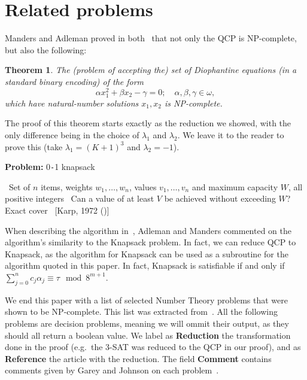 \documentclass{amsart}
\theoremstyle{plain}
\newtheorem{theorem}{Theorem}
\begin{document}
\section{Related problems}

Manders and Adleman proved in both~\cite{qcp1,qcp2} that not only the QCP is NP-complete, but also
the following:

\begin{theorem}\label{diophantine-thm}
  The (problem of accepting the) set of Diophantine equations (in a standard binary encoding) of
  the form
  \begin{equation*}
    \alpha x_1^2+\beta x_2-\gamma=0;\quad\alpha,\beta,\gamma\in\omega,
  \end{equation*}
  which have natural-number solutions $x_1,x_2$ is NP-complete.
\end{theorem}

The proof of this theorem starts exactly as the reduction we showed, with the only difference being
in the choice of $\lambda_1$ and $\lambda_2$. We leave it to the reader to prove this (take
$\lambda_1={(K+1)}^3$ and $\lambda_2=-1$).

\begin{algorithm}[h]
  \caption*{\textbf{Problem:} 0\texttt{-}1 knapsack}
  \begin{algorithmic}[1]
    \Require\, Set of $n$ items, weights $w_1,\ldots,w_n$, values $v_1,\ldots,v_n$ and maximum
    capacity $W$, all positive integers
    \Description\, Can a value of at least $V$ be achieved without exceeding $W$?
    \Reduction\, Exact cover
    \Reference\, [Karp, 1972 (\cite{karp})]
  \end{algorithmic}
\end{algorithm}

When describing the algorithm in~\cite{qcp2}, Adleman and Manders commented on the algorithm's
similarity to the Knapsack problem. In fact, we can reduce QCP to Knapsack, as the algorithm for
Knapsack can be used as a subroutine for the algorithm quoted in this paper. In fact, Knapsack is
satisfiable if and only if $\sum_{j=0}^n c_j\alpha_j\equiv\tau\mod 8^{m+1}$.

We end this paper with a list of selected Number Theory problems that were shown to be NP-complete.
This list was extracted from~\cite{garey-johnson}. All the following problems are decision
problems, meaning we will ommit their output, as they should all return a boolean value.  We label
as \textbf{Reduction} the transformation done in the proof (e.g.\ the 3-SAT was reduced to the QCP
in our proof), and as \textbf{Reference} the article with the reduction. The field \textbf{Comment}
contains comments given by Garey and Johnson on each problem~\cite{garey-johnson}.
\end{document}
